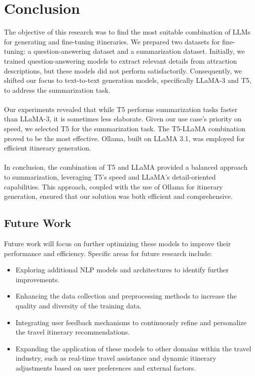 \documentclass[conference]{IEEEtran}
\begin{document}
\section{Conclusion}

    The objective of this research was to find the most suitable combination of LLMs for generating and fine-tuning itineraries. We prepared two datasets for fine-tuning: a question-answering dataset and a summarization dataset. Initially, we trained question-answering models to extract relevant details from attraction descriptions, but these models did not perform satisfactorily. Consequently, we shifted our focus to text-to-text generation models, specifically LLaMA-3 and T5, to address the summarization task.
    {\\\\}
    Our experiments revealed that while T5 performs summarization tasks faster than LLaMA-3, it is sometimes less elaborate. Given our use case's priority on speed, we selected T5 for the summarization task. The T5-LLaMA combination proved to be the most effective. Ollama, built on LLaMA 3.1, was employed for efficient itinerary generation.
    {\\\\}
    In conclusion, the combination of T5 and LLaMA provided a balanced approach to summarization, leveraging T5's speed and LLaMA's detail-oriented capabilities. This approach, coupled with the use of Ollama for itinerary generation, ensured that our solution was both efficient and comprehensive.

    \subsection{Future Work}

        Future work will focus on further optimizing these models to improve their performance and efficiency. Specific areas for future research include:
        \begin{itemize}
            \item Exploring additional NLP models and architectures to identify further improvements.
            \item Enhancing the data collection and preprocessing methods to increase the quality and diversity of the training data.
            \item Integrating user feedback mechanisms to continuously refine and personalize the travel itinerary recommendations.
            \item Expanding the application of these models to other domains within the travel industry, such as real-time travel assistance and dynamic itinerary adjustments based on user preferences and external factors.
        \end{itemize}
\end{document}
